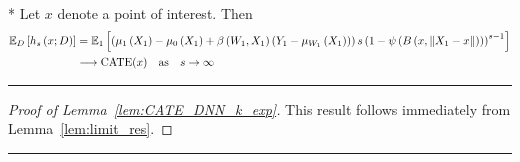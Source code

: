 \begin{lem}\label{lem:CATE_DNN_k_exp}\mbox{}\\*
	Let $x$ denote a point of interest.
	Then
	\begin{equation}
		\begin{aligned}
			\mathbb{E}_D\left[h_s\left(x; D\right)\right]
			& = \mathbb{E}_{1}\left[\left(\mu_{1}\left(X_1\right) - \mu_{0}\left(X_1\right) + \beta\left(W_{1}, X_1\right)\left(Y_{1} - \mu_{W_{1}}\left(X_1\right)\right)\right)
			s\left(1 - \psi\left(B\left(x, \|X_1 - x\|\right)\right)\right)^{s-1}\right]\\
			& \longrightarrow \operatorname{CATE}(x) \quad \text{as} \quad s \rightarrow \infty
		\end{aligned}
	\end{equation}
\end{lem}
\hrule
\begin{proof}[Proof of Lemma~\ref{lem:CATE_DNN_k_exp}]
	This result follows immediately from Lemma~\ref{lem:limit_res}.
\end{proof}

\hrule


